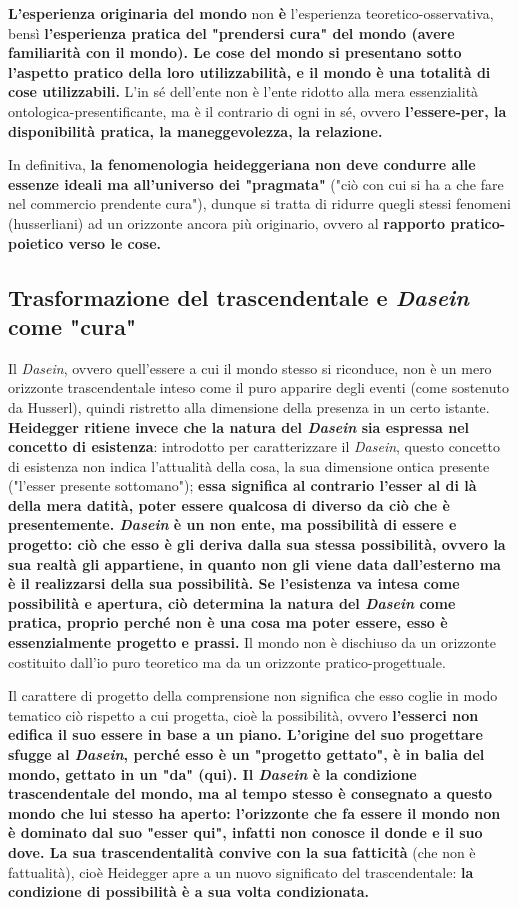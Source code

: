 \textbf{L'esperienza originaria del mondo} non \textbf{è} l'esperienza
teoretico-osservativa, bensì \textbf{l'esperienza pratica del
"prendersi cura" del mondo (avere familiarità con il mondo).
Le cose del mondo si presentano sotto l'aspetto
pratico della loro utilizzabilità, e il mondo è
una totalità di cose utilizzabili.}
L'in sé dell'ente non è l'ente ridotto alla mera
essenzialità ontologica-presentificante, ma è il
contrario di ogni in sé, ovvero \textbf{l'essere-per, la
disponibilità pratica, la maneggevolezza, la relazione.}

In definitiva,\textbf{ la fenomenologia heideggeriana non deve
condurre alle essenze ideali ma all'universo dei
"pragmata"} ("ciò con cui si ha a che fare nel commercio
prendente cura"), dunque si tratta di ridurre
quegli stessi fenomeni (husserliani) ad un
orizzonte ancora più originario, ovvero al
\textbf{rapporto pratico-poietico verso le cose.}

\subsection{Trasformazione del trascendentale e \textit{Dasein} come "cura"}

Il \textit{Dasein}, ovvero quell'essere a cui il mondo stesso si
riconduce, non è un mero orizzonte trascendentale
inteso come il puro apparire degli eventi (come sostenuto da
Husserl), quindi ristretto alla dimensione
della presenza in un certo istante.
\textbf{Heidegger ritiene invece che la natura del \textit{Dasein} sia
espressa nel concetto di esistenza}: introdotto per caratterizzare il \textit{Dasein}, questo concetto
di esistenza non
indica l'attualità della cosa, la sua dimensione ontica
presente ("l'esser presente sottomano"); \textbf{essa significa
al contrario l'esser al di là della mera datità, poter
essere qualcosa di diverso da ciò che è presentemente.
\textit{Dasein} è un non ente, ma possibilità di essere e
progetto: ciò che esso è gli deriva dalla sua stessa
possibilità, ovvero la sua realtà gli appartiene,
in quanto non gli viene data dall'esterno ma è
il realizzarsi della sua possibilità.
Se l'esistenza va intesa come possibilità e apertura,
ciò determina la natura del \textit{Dasein} come pratica,
proprio perché non è una cosa ma poter essere,
esso è essenzialmente progetto e prassi.}
Il mondo non è dischiuso da un orizzonte costituito
dall'io puro teoretico ma da un orizzonte pratico-progettuale.

Il carattere di progetto della comprensione non
significa che esso coglie in modo tematico ciò
rispetto a cui progetta, cioè la possibilità, ovvero
\textbf{l'esserci non edifica il suo essere in base a un
piano. L'origine del suo progettare sfugge al \textit{Dasein},
perché esso è un "progetto gettato", è in balia
del mondo, gettato in un "da" (qui).
Il \textit{Dasein} è la condizione trascendentale del mondo,
ma al tempo stesso è consegnato a questo mondo
che lui stesso ha aperto: l'orizzonte che fa essere
il mondo non è dominato dal suo "esser qui", infatti
non conosce il donde e il suo dove. La sua
trascendentalità convive con la sua fatticità} (che non
è fattualità), cioè Heidegger apre a un nuovo
significato del trascendentale: \textbf{la condizione di
possibilità è a sua volta condizionata.}

